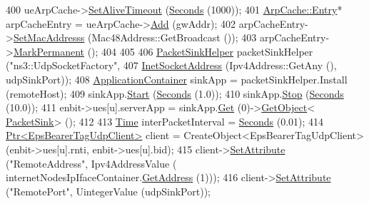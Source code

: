 \begin{DoxyCode}
400           ueArpCache->\hyperlink{classns3_1_1ArpCache_a69b80e4ba6fa363178e72eb090a903d4}{SetAliveTimeout} (\hyperlink{group__timecivil_ga33c34b816f8ff6628e33d5c8e9713b9e}{Seconds} (1000));          
401           \hyperlink{classns3_1_1ArpCache_1_1Entry}{ArpCache::Entry}* arpCacheEntry = ueArpCache->\hyperlink{classns3_1_1ArpCache_a7fb6a10eb08b6fb3af0f7848a28a61b4}{Add} (gwAddr);
402           arpCacheEntry->\hyperlink{classns3_1_1ArpCache_1_1Entry_ae9d1394aee7893efbde4b877e718239c}{SetMacAddresss} (Mac48Address::GetBroadcast ());
403           arpCacheEntry->\hyperlink{classns3_1_1ArpCache_1_1Entry_a56daea587c2bdff382ed5b41878a7f92}{MarkPermanent} ();
404   
405           
406           \hyperlink{classns3_1_1PacketSinkHelper}{PacketSinkHelper} packetSinkHelper (\textcolor{stringliteral}{"ns3::UdpSocketFactory"}, 
407                                              \hyperlink{classns3_1_1InetSocketAddress}{InetSocketAddress} (Ipv4Address::GetAny (), 
      udpSinkPort));          
408           \hyperlink{classns3_1_1ApplicationContainer}{ApplicationContainer} sinkApp = packetSinkHelper.Install (remoteHost);
409           sinkApp.\hyperlink{classns3_1_1ApplicationContainer_a8eff87926507020bbe3e1390358a54a7}{Start} (\hyperlink{group__timecivil_ga33c34b816f8ff6628e33d5c8e9713b9e}{Seconds} (1.0));
410           sinkApp.\hyperlink{classns3_1_1ApplicationContainer_adfc52f9aa4020c8714679b00bbb9ddb3}{Stop} (\hyperlink{group__timecivil_ga33c34b816f8ff6628e33d5c8e9713b9e}{Seconds} (10.0));
411           enbit->ues[u].serverApp = sinkApp.\hyperlink{classns3_1_1ApplicationContainer_a9e565807abd4213a56566a7ccd8d7509}{Get} (0)->\hyperlink{classns3_1_1Object_a13e18c00017096c8381eb651d5bd0783}{GetObject}<
      \hyperlink{classns3_1_1PacketSink}{PacketSink}> ();
412           
413           \hyperlink{classns3_1_1Time}{Time} interPacketInterval = \hyperlink{group__timecivil_ga33c34b816f8ff6628e33d5c8e9713b9e}{Seconds} (0.01);
414           \hyperlink{classns3_1_1Ptr}{Ptr<EpsBearerTagUdpClient>} client = CreateObject<EpsBearerTagUdpClient>
       (enbit->ues[u].rnti, enbit->ues[u].bid);
415           client->\hyperlink{classns3_1_1ObjectBase_ac60245d3ea4123bbc9b1d391f1f6592f}{SetAttribute} (\textcolor{stringliteral}{"RemoteAddress"}, Ipv4AddressValue (
      internetNodesIpIfaceContainer.\hyperlink{classns3_1_1Ipv4InterfaceContainer_ae63208dcd222be986822937ee4aa828c}{GetAddress} (1)));
416           client->\hyperlink{classns3_1_1ObjectBase_ac60245d3ea4123bbc9b1d391f1f6592f}{SetAttribute} (\textcolor{stringliteral}{"RemotePort"}, UintegerValue (udpSinkPort));          

\end{DoxyCode}
